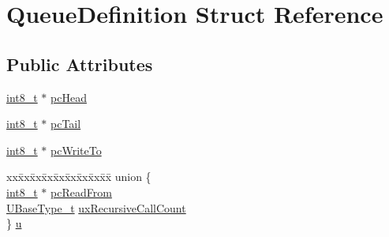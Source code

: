 \hypertarget{struct_queue_definition}{}\section{Queue\+Definition Struct Reference}
\label{struct_queue_definition}
\subsection*{Public Attributes}
\begin{DoxyCompactItemize}
\item 
\hyperlink{_p_e___types_8h_aef44329758059c91c76d334e8fc09700}{int8\+\_\+t} $\ast$ \hyperlink{struct_queue_definition_a487dc7e43b380c58212cba72bc33e0ed}{pc\+Head}
\item 
\hyperlink{_p_e___types_8h_aef44329758059c91c76d334e8fc09700}{int8\+\_\+t} $\ast$ \hyperlink{struct_queue_definition_a189dc1b16fc2152dd9441ea1a117b0ce}{pc\+Tail}
\item 
\hyperlink{_p_e___types_8h_aef44329758059c91c76d334e8fc09700}{int8\+\_\+t} $\ast$ \hyperlink{struct_queue_definition_abdf13cc013c8488848cee3fce4f0fed3}{pc\+Write\+To}
\item 
\begin{tabbing}
xx\=xx\=xx\=xx\=xx\=xx\=xx\=xx\=xx\=\kill
union \{\\
\>\hyperlink{_p_e___types_8h_aef44329758059c91c76d334e8fc09700}{int8\_t} $\ast$ \hyperlink{struct_queue_definition_a970cf73ab9c7382b581bc310b1d947d5}{pcReadFrom}\\
\>\hyperlink{_g_c_c_2_a_r_m___c_m3_2portmacro_8h_a646f89d4298e4f5afd522202b11cb2e6}{UBaseType\_t} \hyperlink{struct_queue_definition_a2cf88e286477f6f89fe1009d722dc4cf}{uxRecursiveCallCount}\\
\} \hyperlink{struct_queue_definition_a8ae401c468321d677eaddb4e1ff9a9b1}{u}\\


\end{tabbing}
\end{DoxyCompactItemize}
